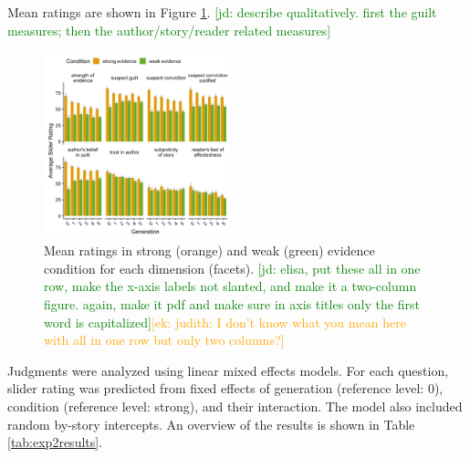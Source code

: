 \documentclass[10pt,letterpaper]{article}
\newcommand{\ek}[1]{\textcolor{Orange}{[ek: #1]}}
\newcommand{\jd}[1]{\textcolor{Green}{[jd: #1]}}
\begin{document}
Mean ratings are shown in Figure \ref{fig:exp2results}. \jd{describe qualitatively. first the guilt measures; then the author/story/reader related measures}

\begin{figure}[H]
	\includegraphics[width=0.48\textwidth]{graphs/subj_results_byquestion.png}
	\caption{Mean ratings  in strong (orange) and weak (green) evidence condition for each dimension (facets). \jd{elisa, put these all in one row, make the x-axis labels not slanted, and make it a two-column figure. again, make it pdf and make sure in axis titles only the first word is capitalized}\ek{judith: I don't know what you mean here with all in one row but only two columns?}} 
	\label{fig:exp2results}
\end{figure}

Judgments were analyzed using linear mixed effects models. For each question, slider rating was predicted from fixed effects of generation (reference level: 0), condition (reference level: strong), and their interaction. The model also included random by-story intercepts. An overview of the results is shown in Table \ref{tab:exp2results}.
\end{document}
